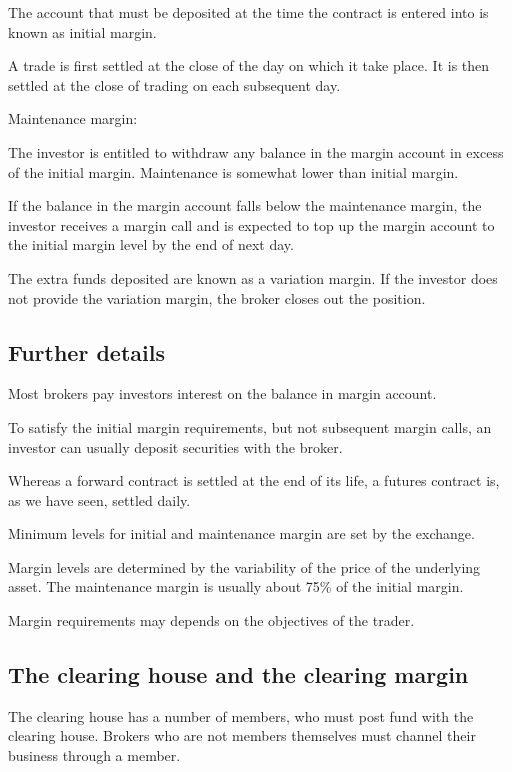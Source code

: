 \documentclass{article}
\begin{document}
The account that must be deposited at the time the contract is entered into is known as initial margin. 

A trade is first settled at the close of the day on which it take place. It is then settled at the close of trading on each subsequent day.
\\ \hspace*{\fill}

Maintenance margin:

The investor is entitled to withdraw any balance in the margin account in excess of the initial margin. Maintenance is somewhat lower than initial margin.

If the balance in the margin account falls below the maintenance margin, the investor receives a margin call and is expected to top up the margin account to the initial margin level by the end of next day.

The extra funds deposited are known as a variation margin. If the investor does not provide the variation margin, the broker closes out the position. 

\subsection{Further details}
Most brokers pay investors interest on the balance in margin account. 

To satisfy the initial margin requirements, but not subsequent margin calls, an investor can usually deposit securities with the broker.

Whereas a forward contract is settled at the end of its life, a futures contract is, as we have seen, settled daily.

Minimum levels for initial and maintenance margin are set by the exchange.

Margin levels are determined by the variability of the price of the underlying asset. The maintenance margin is usually about 75\% of the initial margin.

Margin requirements may depends on the objectives of the trader.

\subsection{The clearing house and the clearing margin}
The clearing house has a number of members, who must post fund with the clearing house. Brokers who are not members themselves must channel their business through a member.
\end{document}
